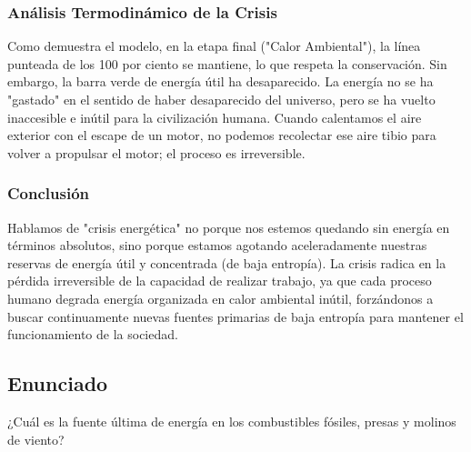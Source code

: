 \documentclass[12pt,a4paper]{article}
\begin{document}
\subsubsection*{Análisis Termodinámico de la Crisis}
Como demuestra el modelo, en la etapa final ("Calor Ambiental"), la línea punteada de los 100 por ciento se mantiene, lo que respeta la conservación. Sin embargo, la barra verde de energía útil ha desaparecido. La energía no se ha "gastado" en el sentido de haber desaparecido del universo, pero se ha vuelto inaccesible e inútil para la civilización humana. Cuando calentamos el aire exterior con el escape de un motor, no podemos recolectar ese aire tibio para volver a propulsar el motor; el proceso es irreversible.

\subsubsection*{Conclusión}
Hablamos de "crisis energética" no porque nos estemos quedando sin energía en términos absolutos, sino porque estamos agotando aceleradamente nuestras reservas de energía útil y concentrada (de baja entropía). La crisis radica en la pérdida irreversible de la capacidad de realizar trabajo, ya que cada proceso humano degrada energía organizada en calor ambiental inútil, forzándonos a buscar continuamente nuevas fuentes primarias de baja entropía para mantener el funcionamiento de la sociedad.

\newpage

\subsection*{Enunciado}
¿Cuál es la fuente última de energía en los combustibles fósiles, presas y molinos de viento?

\begin{center}
\end{center}
\end{document}
